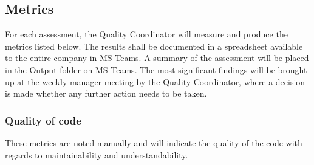 
\subsection{Metrics}
\label{subsec:metrics}
For each assessment, the Quality Coordinator will measure and produce the metrics listed below. The results shall be documented in a spreadsheet available to the entire company in MS Teams. A summary of the assessment will be placed in the Output folder on MS Teams. The most significant findings will be brought up at the weekly manager meeting by the Quality Coordinator, where a decision is made whether any further action needs to be taken.

\subsubsection{Quality of code}
These metrics are noted manually and will indicate the quality of the code with regards to maintainability and understandability.


